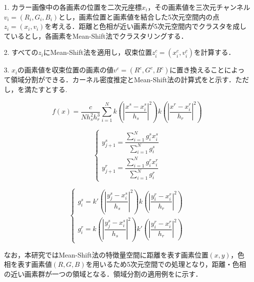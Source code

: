       1. カラー画像中の各画素の位置を二次元座標$x_i$，その画素値を三次元チャンネル$v_{i} =(R_{i},G_{i},B_{i})$とし，画素位置と画素値を結合した5次元空間内の点$z_{i} = (x_{i}, v_{i})$を考える．距離と色相が近い画素が5次元空間内でクラスタを成しているとし，各画素をMean-Shift法でクラスタリングする．

      2. すべての$z_{i}$にMean-Shift法を適用し，収束位置$z_{i}^c = (x_{i}^c , v_{i}^c)$を計算する．
      
      3. $x_{i}$の画素値を収束位置の画素の値$v^c = (R^c, G^c, B^c)$に置き換えることによって領域分割ができる．カーネル密度推定とMean-Shift法の計算式をと示す．ただし，を満たすとする.
    
      \begin{equation}
        \label{Mean-Shift法1}
        f(x) = \dfrac{c} {N h_{s}^2 h_{r}^3}
          \sum_{i=1}^{N}
          k (|\dfrac{x^s - x_{i}^s} {h_{s}}|^2) k (|\dfrac{x^r - x_{i}^r} {h_{r}}|^2)
      \end{equation}

      \begin{equation}
        \label{Mean-Shift法2}
        \left\{
          \begin{array}{l}
            y_{j+1}^s = 
              \dfrac{\sum_{i=1}^{N} g_{i}^s x_{i}^s} {\sum_{i=1}^{N} g_{i}^s} \\ 
            y_{j+1}^r = 
              \dfrac{\sum_{i=1}^{N} g_{i}^r x_{i}^r} {\sum_{i=1}^{N} g_{i}^r}
          \end{array}
        \right.
      \end{equation}

      \begin{equation}
        \label{Mean-Shift法3}
        \left\{
          \begin{array}{l}
            g_{i}^s = k' (|\dfrac{y_{j}^s - x_{i}^s} {h_{s}}|^2)
              k  (|\dfrac{y_{i}^r - x_{i}^r} {h_{r}}|^2) \\
            g_{i}^r = k  (|\dfrac{y_{j}^s - x_{i}^s} {h_{s}}|^2) 
              k' (|\dfrac{y_{i}^r - x_{i}^r} {h_{r}}|^2)
          \end{array}
        \right.
      \end{equation}

      なお，本研究ではMean-Shift法の特徴量空間に距離を表す画素位置$(x,y)$，色相を表す画素値$(R,G,B)$を用いるため5次元空間での処理となり，距離・色相の近い画素群が一つの領域となる．領域分割の適用例を\fref{}に示す．

